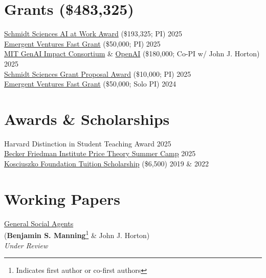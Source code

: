 \documentclass[margin,line,pifont,palatino,courier, 9pt]{res}
\begin{document}
\begin{resume}
\section{\sc Grants (\$483,325)}
\href{https://www.schmidtsciences.org/ai-at-work/}{Schmidt Sciences AI at Work Award} (\$193,325; PI) \hfill 2025 \\
\href{https://www.mercatus.org/emergent-ventures}{Emergent Ventures Fast Grant} (\$50,000; PI) \hfill 2025 \\
\href{https://computing.mit.edu/research/mit-generative-ai-impact-consortium/}{MIT GenAI Impact Consortium} \& \href{https://openai.com/}{OpenAI} (\$180,000; Co-PI w/ John J. Horton) \hfill 2025 \\
\href{https://www.schmidtsciences.org/ai-at-work/}{Schmidt Sciences Grant Proposal Award} (\$10,000; PI) \hfill 2025 \\
\href{https://www.mercatus.org/emergent-ventures}{Emergent Ventures Fast Grant} (\$50,000; Solo PI) \hfill 2024 

\section{\sc Awards \& Scholarships}
Harvard Distinction in Student Teaching Award \hfill 2025 \\
\href{https://bfi.uchicago.edu/events/event/2025-price-theory-summer-camp/}{Becker Friedman Institute Price Theory Summer Camp} \hfill 2025 \\
\href{https://thekf.org/scholarship/tuition-scholarships/tuition-scholarships-for-graduate-studies/}{Kosciuszko Foundation Tuition Scholarship} (\$6,500) \hfill 2019 \& 2022 




\section{\sc Working Papers}

\href{https://benjaminmanning.io/files/optimize.pdf}{General Social Agents}\\
(\textbf{Benjamin S. Manning}\footnote{Indicates first author or co-first authors} \& John J. Horton)\\
\textit{Under Review}


\end{resume}
\end{document}
